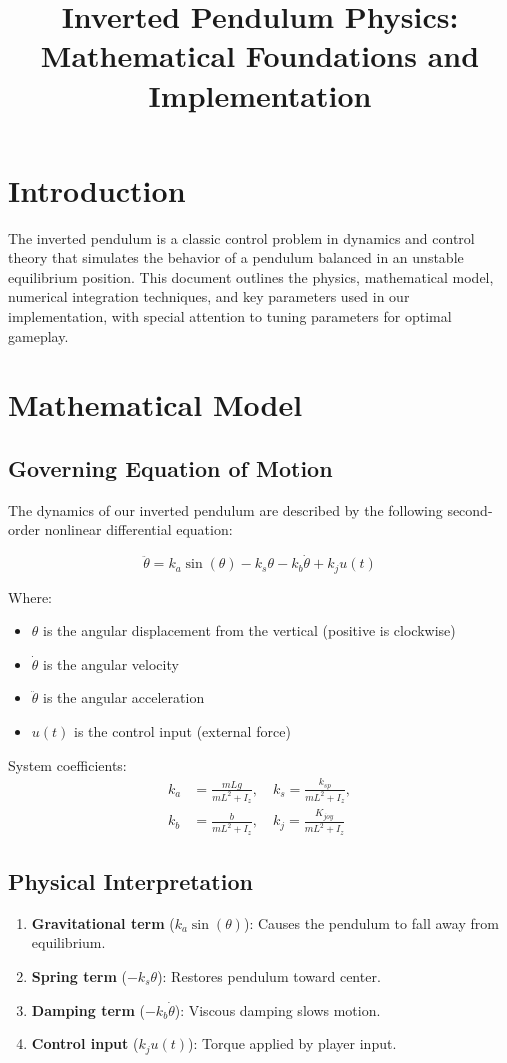 \documentclass[11pt]{article}
\title{Inverted Pendulum Physics: Mathematical Foundations and Implementation}
\author{}
\date{}
\begin{document}
\maketitle

\section*{Introduction}

The inverted pendulum is a classic control problem in dynamics and control theory that simulates the behavior of a pendulum balanced in an unstable equilibrium position. This document outlines the physics, mathematical model, numerical integration techniques, and key parameters used in our implementation, with special attention to tuning parameters for optimal gameplay.

\section{Mathematical Model}

\subsection{Governing Equation of Motion}

The dynamics of our inverted pendulum are described by the following second-order nonlinear differential equation:

\[
\ddot{\theta} = k_a \sin(\theta) - k_s \theta - k_b \dot{\theta} + k_j u(t)
\]

Where:
\begin{itemize}
  \item $\theta$ is the angular displacement from the vertical (positive is clockwise)
  \item $\dot{\theta}$ is the angular velocity
  \item $\ddot{\theta}$ is the angular acceleration
  \item $u(t)$ is the control input (external force)
\end{itemize}

System coefficients:
\[
\begin{aligned}
k_a &= \frac{m L g}{mL^2 + I_z}, \quad
k_s = \frac{k_{sp}}{mL^2 + I_z}, \\
k_b &= \frac{b}{mL^2 + I_z}, \quad
k_j = \frac{K_{joy}}{mL^2 + I_z}
\end{aligned}
\]

\subsection{Physical Interpretation}
\begin{enumerate}
  \item \textbf{Gravitational term} ($k_a \sin(\theta)$): Causes the pendulum to fall away from equilibrium.
  \item \textbf{Spring term} ($-k_s \theta$): Restores pendulum toward center.
  \item \textbf{Damping term} ($-k_b \dot{\theta}$): Viscous damping slows motion.
  \item \textbf{Control input} ($k_j u(t)$): Torque applied by player input.
\end{enumerate}
\end{document}
